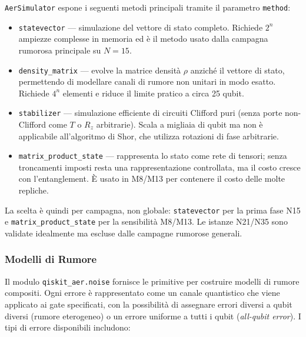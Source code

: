 \begin{onehalfspace}
\texttt{AerSimulator} espone i seguenti metodi principali tramite il parametro \texttt{method}:

\begin{itemize}
    \item \texttt{statevector} — simulazione del vettore di stato completo. Richiede $2^n$ ampiezze complesse in memoria ed è il metodo usato dalla campagna rumorosa principale su $N=15$.

    \item \texttt{density\_matrix} — evolve la matrice densità $\rho$ anziché il vettore di stato, permettendo di modellare canali di rumore non unitari in modo esatto. Richiede $4^n$ elementi e riduce il limite pratico a circa 25 qubit.

    \item \texttt{stabilizer} — simulazione efficiente di circuiti Clifford puri (senza porte non-Clifford come $T$ o $R_z$ arbitrarie). Scala a migliaia di qubit ma non è applicabile all'algoritmo di Shor, che utilizza rotazioni di fase arbitrarie.

    \item \texttt{matrix\_product\_state} — rappresenta lo stato come rete di tensori; senza troncamenti imposti resta una rappresentazione controllata, ma il costo cresce con l'entanglement. È usato in M8/M13 per contenere il costo delle molte repliche.
\end{itemize}

La scelta è quindi per campagna, non globale: \texttt{statevector} per la prima fase N15 e \texttt{matrix\_product\_state} per la sensibilità M8/M13. Le istanze N21/N35 sono validate idealmente ma escluse dalle campagne rumorose generali.

\subsubsection{Modelli di Rumore}

Il modulo \texttt{qiskit\_aer.noise} fornisce le primitive per costruire modelli di rumore compositi. Ogni errore è rappresentato come un canale quantistico che viene applicato ai gate specificati, con la possibilità di assegnare errori diversi a qubit diversi (rumore eterogeneo) o un errore uniforme a tutti i qubit (\textit{all-qubit error}). I tipi di errore disponibili includono:


\end{onehalfspace}
